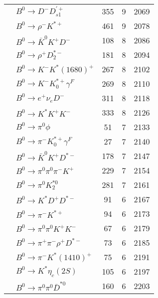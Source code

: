 \documentclass[landscape]{article}
\newcounter{rownumbers}
\newcommand\rn{\stepcounter{rownumbers}\arabic{rownumbers}}
\newcommand{\EOL}{\\} %
\newcommand{\topoTags}[1]{#1} %
\begin{document}
\begin{longtable}{clccc}
\rn & $ B^{0} \rightarrow D^{-} D_{s1}^{\prime+} $ & \topoTags{355 & }9 & 2069 \EOL

\rn & $ B^{0} \rightarrow \rho^{-} K^{*+} $ & \topoTags{461 & }9 & 2078 \EOL

\rn & $ B^{0} \rightarrow \bar{K}^{0} K^{+} D^{-} $ & \topoTags{108 & }8 & 2086 \EOL

\rn & $ B^{0} \rightarrow \rho^{+} D_{2}^{*-} $ & \topoTags{181 & }8 & 2094 \EOL

\rn & $ B^{0} \rightarrow K^{-} K^{*}(1680)^{+} $ & \topoTags{267 & }8 & 2102 \EOL

\rn & $ B^{0} \rightarrow K^{-} K_{0}^{*+} \gamma^{F} $ & \topoTags{269 & }8 & 2110 \EOL

\rn & $ B^{0} \rightarrow e^{+} \nu_{e} D^{-} $ & \topoTags{311 & }8 & 2118 \EOL

\rn & $ B^{0} \rightarrow K^{*} K^{+} K^{-} $ & \topoTags{333 & }8 & 2126 \EOL

\rn & $ B^{0} \rightarrow \pi^{0} \phi $ & \topoTags{51 & }7 & 2133 \EOL

\rn & $ B^{0} \rightarrow \pi^{-} K_{0}^{*+} \gamma^{F} $ & \topoTags{27 & }7 & 2140 \EOL

\rn & $ B^{0} \rightarrow \bar{K}^{0} K^{+} D^{*-} $ & \topoTags{178 & }7 & 2147 \EOL

\rn & $ B^{0} \rightarrow \pi^{0} \pi^{0} \pi^{-} K^{+} $ & \topoTags{229 & }7 & 2154 \EOL

\rn & $ B^{0} \rightarrow \pi^{0} K_2^{*0} $ & \topoTags{281 & }7 & 2161 \EOL

\rn & $ B^{0} \rightarrow K^{*} D^{+} D^{*-} $ & \topoTags{91 & }6 & 2167 \EOL

\rn & $ B^{0} \rightarrow \pi^{-} K^{*+} $ & \topoTags{94 & }6 & 2173 \EOL

\rn & $ B^{0} \rightarrow \pi^{0} \pi^{0} K^{+} K^{-} $ & \topoTags{67 & }6 & 2179 \EOL

\rn & $ B^{0} \rightarrow \pi^{+} \pi^{-} \rho^{+} D^{*-} $ & \topoTags{73 & }6 & 2185 \EOL

\rn & $ B^{0} \rightarrow \pi^{-} K^{*}(1410)^{+} $ & \topoTags{75 & }6 & 2191 \EOL

\rn & $ B^{0} \rightarrow K^{*} \eta_{c}(2S) $ & \topoTags{105 & }6 & 2197 \EOL

\rn & $ B^{0} \rightarrow \pi^{0} \pi^{0} \bar{D}^{*0} $ & \topoTags{160 & }6 & 2203 \EOL


\end{longtable}
\end{document}
